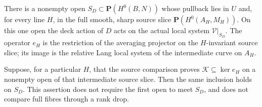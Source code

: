 \begin{proposition}
\label{prop:compatible-intermediate-common-slice}
There is a nonempty open
\(S_D\subset\mathbf P(H^0(B,N))\) whose pullback lies in \(U\)
and, for every line \(H\), in the full smooth, sharp source slice
\(\mathbf P(H^0(A_H,M_H))\). On this one open the deck action
of \(D\) acts on the actual local system \(\mathcal V|_{S_D}\).
The operator \(e_H\) is the restriction of the averaging
projector on the \(H\)-invariant source slice; its image is the
relative Lang local system of the intermediate curve on \(A_H\).

Suppose, for a particular \(H\), that the source comparison
proves \(\mathcal K\subseteq\ker e_H\) on a nonempty open of
that intermediate source slice. Then the same inclusion holds on
\(S_D\). This assertion does not require the first open to meet
\(S_D\), and does not compare full fibres through a rank drop.
\end{proposition}
